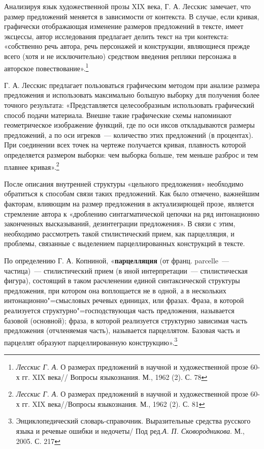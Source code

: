 \documentclass{kursa4}
\begin{document}
      Анализируя язык художественной прозы XIX века, Г. А. Лесскис замечает, что размер предложений меняется в зависимости от контекста. В случае, если кривая, графически отображающая изменение размеров предложений в тексте, имеет эксцессы, автор исследования предлагает делить текст на три контекста: «собственно речь автора, речь персонажей и конструкции, являющиеся прежде всего (хотя и не исключительно) средством введения реплики персонажа в авторское повествование».\footnote{\textit{{ Лесскис Г. А. }}{О размерах предложений в научной и художественной прозе 60-х гг. XIX века// Вопросы языкознания. М., 1962 (2). С. 78}}

      Г. А. Лесскис предлагает пользоваться графическим методом при анализе размера предложения и использовать максимально большую выборку для получения более точного результата: «Представляется целесообразным использовать графический способ подачи материала. Внешне такие графические схемы напоминают геометрическое изображение функций, где по оси иксов откладываются размеры предложений, а по оси игреков~--- количество этих предложений (в процентах). При соединении всех точек на чертеже получается кривая, плавность которой определяется размером выборки: чем выборка больше, тем меньше разброс и тем плавнее кривая».\footnote{\textit{{ Лесскис Г. А. }}{О размерах предложений в научной и художественной прозе 60-х гг. XIX века//Вопросы языкознания. М., 1962 (2). С. 81}}

      После описания внутренней структуры «цельного предложения» необходимо обратиться к способам связи таких предложений. Как было отмечено, важнейшим факторам, влияющим на размер предложения в актуализирющей прозе, является стремление автора к «дроблению синтагматической цепочки на ряд интонационно законченных высказываний, дезинтеграции предложения». В связи с этим, необходимо рассмотреть такой стилистический прием, как парцелляция, и проблемы, связанные с выделением парцеллированных конструкций в тексте. 

      По определению Г. А. Копниной, «\textbf{парцелляция} (от франц. parcelle~--- частица)~--- стилистический прием (в иной интерпретации~--- стилистическая фигура), состоящий в таком расчленении единой синтаксической структуры предложения, при котором она воплощается не в одной, а в нескольких интонационно"=смысловых речевых единицах, или фразах. Фраза, в которой реализуется структурно"=господствующая часть предложения, называется базовой (основной); фраза, в которой реализуется структурно зависимая часть предложения (отчленяемая часть), называется парцеллятом. Базовая часть и парцеллят образуют парцеллированную конструкцию».\footnote{Энциклопедический словарь-справочник. Выразительные средства русского языка и речевые ошибки и недочеты/ Под ред.\textit{А. П. Сковородникова}{. М., 2005. С. 217}}
\end{document}
